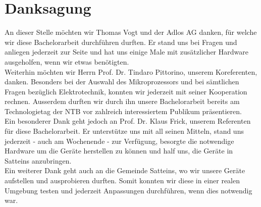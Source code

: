 \section{Danksagung}
An dieser Stelle möchten wir Thomas Vogt und der Adlos AG danken, für welche wir diese Bachelorarbeit durchführen durften. Er stand uns bei Fragen und anliegen jederzeit zur Seite und hat uns einige Male mit zusätzlicher Hardware ausgeholfen, wenn wir etwas benötigten.\\

Weiterhin möchten wir Herrn Prof. Dr. Tindaro Pittorino, unserem Koreferenten, danken. Besonders bei der Auswahl des Mikroprozessors und bei sämtlichen Fragen bezüglich Elektrotechnik, konnten wir jederzeit mit seiner Kooperation rechnen. Ausserdem durften wir durch ihn unsere Bachelorarbeit bereits am Technologietag der NTB vor zahlreich interessiertem Publikum präsentieren.\\

Ein besonderer Dank geht jedoch an Prof. Dr. Klaus Frick, unserem Referenten für diese Bachelorarbeit. Er unterstütze uns mit all seinen Mitteln, stand uns jederzeit - auch am Wochenende - zur Verfügung, besorgte die notwendige Hardware um die Geräte herstellen zu können und half uns, die Geräte in Satteins anzubringen.\\

Ein weiterer Dank geht auch an die Gemeinde Satteins, wo wir unsere Geräte aufstellen und ausprobieren durften. Somit konnten wir diese in einer realen Umgebung testen und jederzeit Anpassungen durchführen, wenn dies notwendig war.

\newpage
